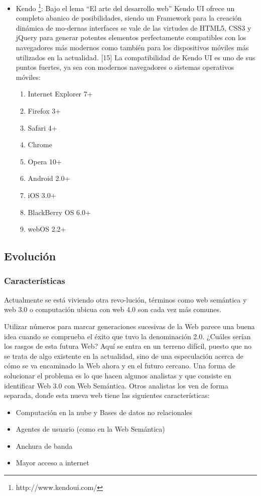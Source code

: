 \begin{itemize}
 \item Kendo \footnote{http://www.kendoui.com/}: Bajo el lema “El arte del desarrollo web” Kendo UI ofrece un completo abanico 
 de posibilidades, siendo un Framework para la creación dinámica de mo-dernas interfaces se vale de las virtudes de HTML5, CSS3 
 y jQuery para generar potentes elementos perfectamente compatibles con los navegadores más modernos como también para los 
 dispositivos móviles más utilizados en la actualidad. [15]
 La compatibilidad de Kendo UI es uno de sus puntos fuertes, ya sea con modernos navegadores o sistemas operativos móviles:
 \begin{enumerate}
  \item Internet Explorer 7+
  \item Firefox 3+
  \item Safari 4+
  \item Chrome
  \item Opera 10+
  \item Android 2.0+
  \item iOS 3.0+
  \item BlackBerry OS 6.0+
  \item webOS 2.2+
 \end{enumerate}
 
 
\end{itemize}


 
\subsection{Evolución}
\subsubsection{Características}
Actualmente se está viviendo otra revo-lución, términos como web semántica y web 3.0 o computación ubicua con web 4.0 son cada vez 
más comunes.

Utilizar números para marcar generaciones sucesivas de la Web parece una buena idea cuando se comprueba el éxito que tuvo la denominación 
2.0. ¿Cuáles serían los rasgos de esta futura Web? Aquí se entra en un terreno difícil, puesto que no se trata de algo existente en la
actualidad, sino de una especulación acerca de cómo se va encaminado la Web ahora y en el futuro cercano. Una forma de solucionar el 
problema es lo que hacen algunos analistas y que consiste en identificar Web 3.0 con Web Semántica. Otros analistas los 
ven de forma separada, donde esta nueva web tiene las siguientes características:
\begin{itemize}
 \item Computación en la nube y Bases de datos no relacionales
 \item Agentes de usuario (como en la Web Semántica)
 \item Anchura de banda
 \item Mayor acceso a internet
\end{itemize}

